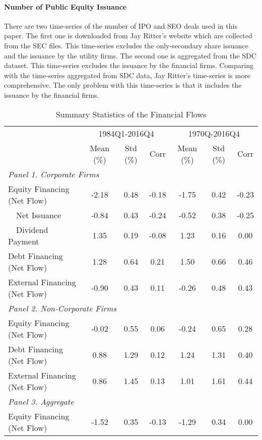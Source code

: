 \documentclass[11pt]{article}
\begin{document}
\paragraph{Number of Public Equity Issuance} There are two time-series of the number of IPO and SEO deals used in this paper. The first one is downloaded from Jay Ritter's website which are collected from the SEC files. This time-series excludes the only-secondary share issuance and the issuance by the utility firms. The second one is aggregated from the SDC dataset. This time-series excludes the issuance by the financial firms. Comparing with the time-series aggregated from SDC data, Jay Ritter's time-series is more comprehensive. The only problem with this time-series is that it includes the issuance by the financial firms.
\begin{table}[htbp]
	\centering
	\caption{Summary Statistics of the Financial Flows}
	\begin{tabular}{lcccccc}
		\toprule[1.5pt]
		& \multicolumn{3}{c}{1984Q1-2016Q4} & \multicolumn{3}{c}{1970Q-2016Q4} \\
		& Mean (\%) & Std (\%)  & Corr  & Mean (\%) & Std (\%)  & Corr \\
		\midrule
		\multicolumn{7}{l}{\textit{Panel 1. Corporate Firms}} \\
		Equity Financing (Net Flow) & -2.18 & 0.48  & -0.18 & -1.75 & 0.42  & -0.23 \\
		\ \ Net Issuance & -0.84 & 0.43  & -0.24 & -0.52 & 0.38  & -0.25 \\
		\ \ Dividend Payment & 1.35  & 0.19  & -0.08 & 1.23  & 0.16  & 0.00 \\
		Debt Financing (Net Flow) & 1.28  & 0.64  & 0.21  & 1.50  & 0.66  & 0.46 \\[0.5em]
		External Financing (Net Flow) & -0.90 & 0.43  & 0.11  & -0.26 & 0.48  & 0.43 \\
		\midrule
		\multicolumn{7}{l}{\textit{Panel 2. Non-Corporate Firms}} \\
		Equity Financing (Net Flow) & -0.02 & 0.55  & 0.06  & -0.24 & 0.65  & 0.28 \\
		Debt Financing (Net Flow) & 0.88  & 1.29  & 0.12  & 1.24  & 1.31  & 0.40 \\[0.5em]
		External Financing (Net Flow) & 0.86  & 1.45  & 0.13  & 1.01  & 1.61  & 0.44 \\
		\midrule
		\multicolumn{7}{l}{\textit{Panel 3. Aggregate}} \\
		Equity Financing (Net Flow) & -1.52 & 0.35  & -0.13 & -1.29 & 0.34  & 0.00 \\

\end{tabular}
\end{table}
\end{document}
